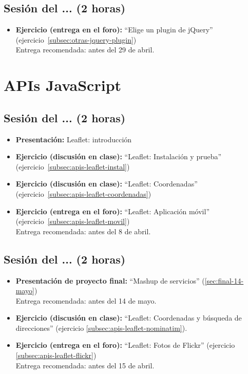 \documentclass[a4paper,12pt]{report}
\begin{document}
\subsection{Sesión del ... (2 horas)}

\begin{itemize}
\item \textbf{Ejercicio (entrega en el foro):} ``Elige un plugin de jQuery'' (ejercicio~\ref{subsec:otras-jquery-plugin}) \\
  Entrega recomendada: antes del 29 de abril.
\end{itemize}

\section{APIs JavaScript}

\subsection{Sesión del ... (2 horas)}

\begin{itemize}
\item \textbf{Presentación:} Leaflet: introducción
\item \textbf{Ejercicio (discusión en clase):} ``Leaflet: Instalación y prueba'' (ejercicio~\ref{subsec:apis-leaflet-instal})
\item \textbf{Ejercicio (discusión en clase):} ``Leaflet: Coordenadas'' (ejercicio~\ref{subsec:apis-leaflet-coordenadas})
\item \textbf{Ejercicio (entrega en el foro):} ``Leaflet: Aplicación móvil'' (ejercicio~\ref{subsec:apis-leaflet-movil}) \\
  Entrega recomendada: antes del 8 de abril.
\end{itemize}

\subsection{Sesión del ... (2 horas)}

\begin{itemize}
\item \textbf{Presentación de proyecto final:} ``Mashup de servicios'' (\ref{sec:final-14-mayo}) \\
  Entrega recomendada: antes del 14 de mayo.
\item \textbf{Ejercicio (discusión en clase):} ``Leaflet: Coordenadas y búsqueda de direcciones'' (ejercicio \ref{subsec:apis-leaflet-nominatim}).
\item \textbf{Ejercicio (entrega en el foro):} ``Leaflet: Fotos de Flickr'' (ejercicio \ref{subsec:apis-leaflet-flickr})  \\
  Entrega recomendada: antes del 15 de abril.
\end{itemize}
\end{document}
